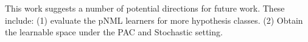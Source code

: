 \documentclass[conference,letterpaper]{IEEEtran}
\begin{document}
This work suggests a number of potential directions
for future work. These include: (1) evaluate the pNML learners for more hypothesis classes. (2) Obtain the learnable space under the PAC and Stochastic setting.

\newpage



%
%




\end{document}
